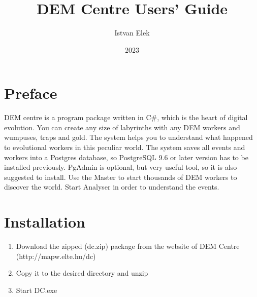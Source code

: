 \documentclass[a4paper,12pt]{article}
\begin{document}
\author{Istvan Elek}
\title{DEM Centre Users' Guide}
\date{2023}

\maketitle
\newpage
\tableofcontents
\newpage


\section{Preface}

DEM centre is a program package written in C\#, which is the heart of digital evolution. You can create any size of labyrinths with any DEM workers and wumpuses, traps and gold. The system  helps you to understand what happened to  evolutional workers in this peculiar world. The system saves all events and workers into a Postgres database, so PostgreSQL 9.6 or later version has to be installed previously. PgAdmin is optional, but very useful tool, so it is also suggested to install. Use the Master to start thousands of DEM workers to discover the world. Start Analyser in order to understand the events.



\section{Installation}

\begin{enumerate}
	\item Download the zipped (dc.zip) package from the website of DEM Centre (http://mapw.elte.hu/dc)
	\item Copy it to the desired directory and unzip
	\item Start DC.exe
\end{enumerate}
\end{document}
